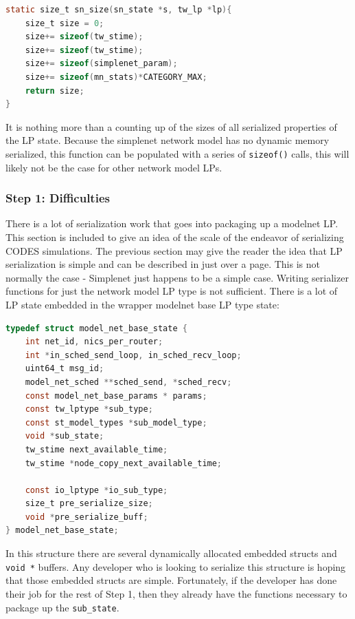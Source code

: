 \documentclass[letterpaper, 11 pt, conference]{IEEEtran}
\begin{document}
\begin{lstlisting}[language=C]
static size_t sn_size(sn_state *s, tw_lp *lp){
	size_t size = 0;
	size+= sizeof(tw_stime);
	size+= sizeof(tw_stime);
	size+= sizeof(simplenet_param);
	size+= sizeof(mn_stats)*CATEGORY_MAX;
	return size;
}
\end{lstlisting}

It is nothing more than a counting up of the sizes of all serialized properties of the LP state. Because the simplenet network model has no dynamic memory serialized, this function can be populated with a series of \texttt{sizeof()} calls, this will likely not be the case for other network model LPs.


\subsubsection{Step 1: Difficulties}
There is a lot of serialization work that goes into packaging up a modelnet LP. This section is included to give an idea of the scale of the endeavor of serializing CODES simulations. The previous section may give the reader the idea that LP serialization is simple and can be described in just over a page. This is not normally the case - Simplenet just happens to be a simple case. Writing serializer functions for just the network model LP type is not sufficient. There is a lot of LP state embedded in the wrapper modelnet base LP type state:

\begin{lstlisting}[language=C]
typedef struct model_net_base_state {
	int net_id, nics_per_router;
	int *in_sched_send_loop, in_sched_recv_loop;
	uint64_t msg_id;
	model_net_sched **sched_send, *sched_recv;
	const model_net_base_params * params;
	const tw_lptype *sub_type;
	const st_model_types *sub_model_type;
	void *sub_state;
	tw_stime next_available_time;
	tw_stime *node_copy_next_available_time;
	
	const io_lptype *io_sub_type;
	size_t pre_serialize_size;
	void *pre_serialize_buff;
} model_net_base_state;
\end{lstlisting}

In this structure there are several dynamically allocated embedded structs and \texttt{void *} buffers. Any developer who is looking to serialize this structure is hoping that those embedded structs are simple. Fortunately, if the developer has done their job for the rest of Step 1, then they already have the functions necessary to package up the \texttt{sub\_state}. 
\end{document}
